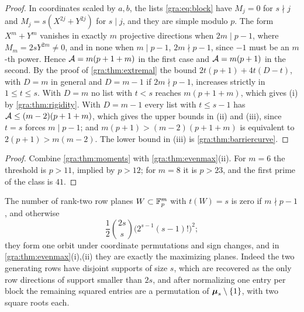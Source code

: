 \begin{proof}
In coordinates scaled by $a,b$, the lists \eqref{gra:eq:block} have
$M_j=0$ for $s\nmid j$ and $M_j=s(X^{2j}+Y^{2j})$ for $s\mid j$, and they
are simple modulo $p$. The form $X^m+Y^m$ vanishes in exactly $m$
projective directions when $2m\mid p-1$, where $M_m=2sY^{2m}\ne0$, and in
none when $m\mid p-1$, $2m\nmid p-1$, since $-1$ must be an $m$-th power.
Hence $\mathcal{A}=m(p+1+m)$ in the first case and $\mathcal{A}=m(p+1)$ in the second.
By the proof of \cref{gra:thm:extremal} the bound $2t(p+1)+4t(D-t)$, with
$D=m$ in general and $D=m-1$ if $2m\nmid p-1$, increases strictly in
$1\le t\le s$. With $D=m$ no list with $t<s$ reaches $m(p+1+m)$, which
gives (i) by \cref{gra:thm:rigidity}. With $D=m-1$ every list with $t\le s-1$
has $\mathcal{A}\le(m-2)(p+1+m)$, which gives the upper bounds in (ii) and (iii),
since $t=s$ forces $m\mid p-1$; and $m(p+1)>(m-2)(p+1+m)$ is equivalent to
$2(p+1)>m(m-2)$. The lower bound in (iii) is \cref{gra:thm:barriercurve}.
\end{proof}


\begin{proof}
Combine \cref{gra:thm:moments} with \cref{gra:thm:evenmax}(ii). For $m=6$
the threshold is $p>11$, implied by $p>12$; for $m=8$ it is $p>23$, and the
first prime of the class is $41$.
\end{proof}

The number of rank-two row planes $W\subset\mathbb{F}_p^m$ with $t(W)=s$ is zero if
$m\nmid p-1$, and otherwise
\[
 \frac12\binom{2s}s\bigl(2^{s-1}(s-1)!\bigr)^2 ;
\]
they form one orbit under coordinate permutations and sign changes, and in
\cref{gra:thm:evenmax}(i),(ii) they are exactly the maximizing planes.
Indeed the two generating rows have disjoint supports of size $s$, which
are recovered as the only row directions of support smaller than $2s$, and
after normalizing one entry per block the remaining squared entries are a
permutation of $\boldsymbol{\mu}_s\setminus\{1\}$, with two square roots each.

